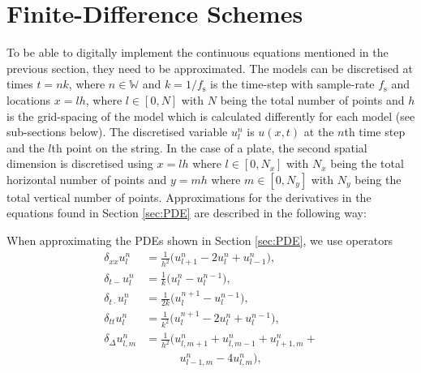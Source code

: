 \documentclass{article}
\begin{document}
\section{Finite-Difference Schemes}\label{sec:FDS}
To be able to digitally implement the continuous equations mentioned in the previous section, they need to be approximated. The models can be discretised at times $t = nk$, where $n \in \mathbb{W}$ and $k = 1 / f_\text{s}$ is the time-step with sample-rate $f_\text{s}$ and locations $x = lh$, where $l \in [0,N]$ with $N$ being the total number of points and $h$ is the grid-spacing of the model which is calculated differently for each model (see sub-sections below). The discretised variable $u_l^n$ is $u(x,t)$ at the $n$th time step and the $l$th point on the string. In the case of a plate, the second spatial dimension is discretised using $x = lh$ where $l \in [0,N_x]$ with $N_x$ being the total horizontal number of points and $y = mh$ where $m \in [0,N_y]$ with $N_y$ being the total vertical number of points. 
Approximations for the derivatives in the equations found in Section \ref{sec:PDE} are described in the following way: 

When approximating the PDEs shown in Section \ref{sec:PDE}, we use operators 
    \begin{align}
        \label{eq:secondSpacex}\delta_{xx}u_l^n &= \frac{1}{h^2}\big(u_{l+1}^n - 2u_l^n + u_{l-1}^n\big),\\
        \label{eq:backwardsTime}\delta_{t-} u^n_l &= \frac{1}{k}\big(u_l^{n}-u_l^{n-1}\big),\\
        \label{eq:centerTime}\delta_{t\cdot} u^n_l &= \frac{1}{2k}\big(u_l^{n+1}-u_l^{n-1}\big),\\
        \label{eq:secondTime}\delta_{tt}u_l^n &= \frac{1}{k^2} \big(u_l^{n+1} - 2u_l^n + u_l^{n-1}\big),\\
         \label{eq:2D}\delta_\Delta u_{l,m}^n &= \frac{1}{h^2}(u_{l,m+1}^n+u_{l,m-1}^n+u_{l+1,m}^n+ \\
         & \qquad \quad u_{l-1,m}^n - 4u_{l,m}^n),
    \end{align}
\end{document}
